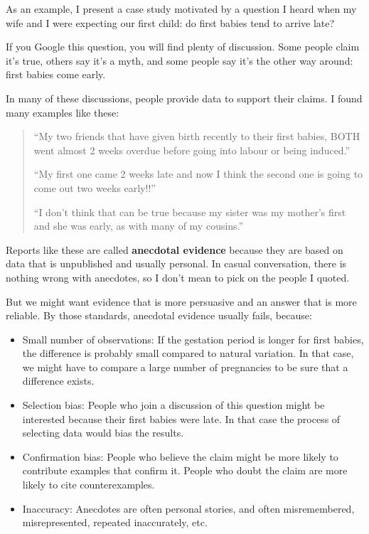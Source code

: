 \documentclass[12pt]{book}
\begin{document}
As an example, I present a case study motivated by a question
I heard when my wife and I were expecting our first child: do first
babies tend to arrive late?

If you Google this question, you will find plenty of discussion.  Some
people claim it's true, others say it's a myth, and some people say
it's the other way around: first babies come early.

In many of these discussions, people provide data to support their
claims.  I found many examples like these:

\begin{quote}

``My two friends that have given birth recently to their first babies,
BOTH went almost 2 weeks overdue before going into labour or being
induced.''

``My first one came 2 weeks late and now I think the second one is
going to come out two weeks early!!''

``I don't think that can be true because my sister was my mother's
first and she was early, as with many of my cousins.''

\end{quote}

Reports like these are called {\bf anecdotal evidence} because they
are based on data that is unpublished and usually personal.  In casual
conversation, there is nothing wrong with anecdotes, so I don't mean
to pick on the people I quoted.

But we might want evidence that is more persuasive and
an answer that is more reliable.  By those standards, anecdotal
evidence usually fails, because:

\begin{itemize}

\item Small number of observations: If the gestation period is longer
  for first babies, the difference is probably small compared to
  natural variation.  In that case, we might have to compare a large
  number of pregnancies to be sure that a difference exists.

\item Selection bias: People who join a discussion of this question
  might be interested because their first babies were late.  In that
  case the process of selecting data would bias the results.

\item Confirmation bias:  People who believe the claim might be more
  likely to contribute examples that confirm it.  People who doubt the
  claim are more likely to cite counterexamples.

\item Inaccuracy: Anecdotes are often personal stories, and often
  misremembered, misrepresented, repeated
  inaccurately, etc.

\end{itemize}
\end{document}
